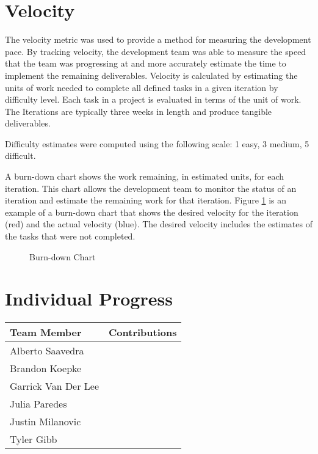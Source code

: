 \documentclass[12pt]{elsarticle}
\begin{document}


\section{Velocity}

The velocity metric was used to provide a method for measuring the development pace. By tracking velocity, the development team was able to measure the speed that the team was progressing at and more accurately estimate the time to implement the remaining deliverables. Velocity is calculated by estimating the units of work needed to complete all defined tasks in a given iteration by difficulty level. Each task in a project is evaluated in terms of the unit of work. The Iterations are typically three weeks in length and produce tangible deliverables.

Difficulty estimates were computed using the following scale: 1 easy, 3 medium, 5 difficult.

A burn-down chart shows the work remaining, in estimated units, for each iteration. This chart allows the development team to monitor the status of an iteration and estimate the remaining work for that iteration. Figure \ref{burndown} is an example of a burn-down chart that shows the desired velocity for the iteration (red) and the actual velocity (blue). The desired velocity includes the estimates of the tasks that were not completed.

\begin{figure}[!ht]
	\centering
\caption{Burn-down Chart}
\label{burndown}
\end{figure}

\section{Individual Progress}

\begin{table}[!ht]
  \begin{tabular}{|l|p{11cm}|}
    \hline
    \textbf{Team Member} & \textbf{Contributions} \\
    \hline
    Alberto Saavedra & \\
    \hline
    Brandon Koepke & \\
    \hline
    Garrick Van Der Lee & \\
    \hline
    Julia Paredes & \\
    \hline
    Justin Milanovic & \\
    \hline
    Tyler Gibb & \\
    \hline
  \end{tabular}
\end{table}
\end{document}
